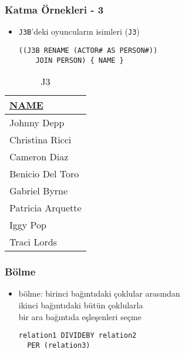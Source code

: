 \documentclass[dvipsnames]{beamer}
\theoremstyle{plain}
\begin{document}
\begin{frame}[fragile]
  \frametitle{Katma Örnekleri - 3}

    \begin{itemize}
      \item \texttt{J3B}'deki oyuncuların isimleri (\texttt{J3})

    \begin{lstlisting}
((J3B RENAME (ACTOR# AS PERSON#))
    JOIN PERSON) { NAME }
    \end{lstlisting}
    \end{itemize}

    \vspace{-10pt}
    \begin{tiny}
    \begin{table}
      \caption{J3}
      \begin{tabular}{|l|}\hline
\underline{NAME} \\[2pt]\hline\hline
Johnny Depp      \\\hline
Christina Ricci  \\\hline
Cameron Diaz     \\\hline
Benicio Del Toro \\\hline
Gabriel Byrne    \\\hline
Patricia Arquette\\\hline
Iggy Pop         \\\hline
Traci Lords      \\\hline
      \end{tabular}
    \end{table}
    \end{tiny}
\end{frame}

\begin{frame}[fragile]
  \frametitle{Bölme}
   
   \begin{itemize}
    \item \alert{bölme}: birinci bağıntıdaki çoklular arasından\\
      ikinci bağıntıdaki bütün çoklularla\\
      bir ara bağıntıda eşleşenleri seçme

    \begin{lstlisting}
relation1 DIVIDEBY relation2
  PER (relation3)
    \end{lstlisting}
  \end{itemize}
\end{frame}
\end{document}
